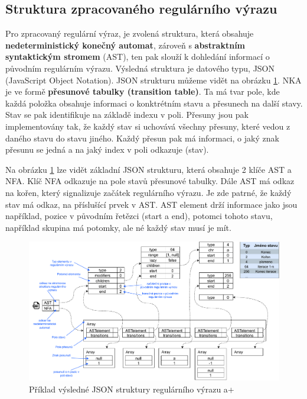 \newpage

\subsection*{Struktura zpracovaného regulárního výrazu}

Pro zpracovaný regulární výraz, je zvolená struktura, která obsahuje \textbf{nedeterministický konečný automat}, zároveň s \textbf{abstraktním syntaktickým stromem} (AST), 
ten pak slouží k dohledání informací o původním regulárním výrazu. 
Výsledná struktura je datového typu, JSON (JavaScript Object Notation).
JSON strukturu můžeme vidět na obrázku \ref{fig:JSONex}.
NKA je ve formě \textbf{přesunové tabulky (transition table)}. 
Ta má tvar pole, kde každá položka obsahuje informaci o konktrétním stavu a přesunech na další stavy.
Stav se pak identifikuje na základě indexu v poli. 
Přesuny jsou pak implementovány tak, že každý stav si uchovává všechny přesuny, které vedou z daného stavu do stavu jiného.
Každý přesun pak má informaci, o jaký znak přesunu se jedná a na jaký index v poli odkazuje (stav). 

Na obrázku \ref{fig:JSONex} lze vidět základní JSON strukturu, která obsahuje 2 klíče AST a NFA.
Klíč NFA odkazuje na pole stavů přesunové tabulky. 
Dále AST má odkaz na kořen, který signalizuje začátek regulárního výrazu.
Je zde patrné, že každý stav má odkaz, na příslušící prvek v AST. 
AST element drží informace jako jsou například, pozice v původním řetězci (start a end), 
potomci tohoto stavu, například skupina má potomky, ale né každý stav musí je mít.

\begin{figure}[!h]
	\centering
	\includegraphics[width=1\textwidth]{Figures/BP-JSON.pdf}
	\caption{Příklad výsledné JSON struktury regulárního výrazu a+}
	\label{fig:JSONex}
\end{figure}

